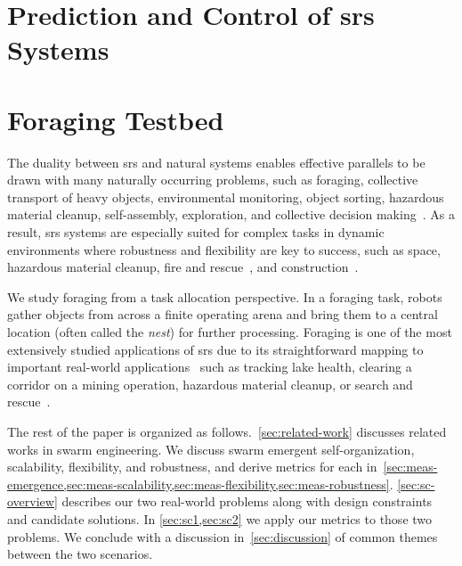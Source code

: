 \section{Prediction and Control of \gls{srs} Systems}



\section{Foraging Testbed}


The duality between \gls{srs} and natural systems enables effective parallels to
be drawn with many naturally occurring problems, such as foraging, collective
transport of heavy objects, environmental monitoring, object sorting, hazardous
material cleanup, self-assembly, exploration, and collective decision
making~\cite{Hecker2015,Kumar2003,CarrilloZapata2020}.  As a result, \gls{srs}
systems are especially suited for complex tasks in dynamic environments where
robustness and flexibility are key to success, such as space, hazardous material
cleanup, fire and
rescue~\cite{Rouff2004,CarrilloZapata2020,Sahin2005,Flushing2014}, and
construction~\cite{Petersen2011}.

%

We study foraging from a task allocation perspective. In a foraging task, robots
gather objects from across a finite operating arena and bring them to a central
location (often called the \emph{nest}) for further processing. Foraging is one
of the most extensively studied applications of \gls{srs} due to its
straightforward mapping to important real-world applications~\cite{Hecker2015}
such as tracking lake health, clearing a corridor on a mining operation,
hazardous material cleanup, or search and
rescue~\cite{Sahin2005,Hecker2015,Labella}.


%
%
The rest of the paper is organized as follows.~\cref{sec:related-work} discusses
related works in swarm engineering. We discuss swarm emergent self-organization,
scalability, flexibility, and robustness, and derive metrics for each
in~\cref{sec:meas-emergence,sec:meas-scalability,sec:meas-flexibility,sec:meas-robustness}.
\cref{sec:sc-overview} describes our two real-world problems along with design
constraints and candidate solutions. In \cref{sec:sc1,sec:sc2} we apply our
metrics to those two problems. We conclude with a discussion
in~\cref{sec:discussion} of common themes between the two scenarios.

